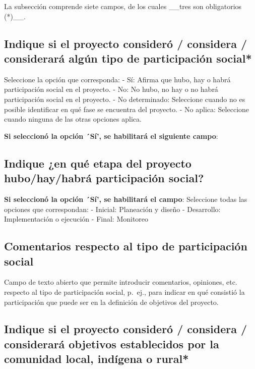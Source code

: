 \documentclass[
]{book}
\begin{document}
La subsección comprende siete campos, de los cuales \_\_tres son obligatorios (*)\_\_.

\hypertarget{indique-si-el-proyecto-consideruxf3-considera-consideraruxe1-alguxfan-tipo-de-participaciuxf3n-social}{%
\subsection{Indique si el proyecto consideró / considera / considerará algún tipo de participación social*}\label{indique-si-el-proyecto-consideruxf3-considera-consideraruxe1-alguxfan-tipo-de-participaciuxf3n-social}}

Seleccione la opción que corresponda:
- Sí: Afirma que hubo, hay o habrá participación social en el proyecto.
- No: No hubo, no hay o no habrá participación social en el proyecto.
- No determinado: Seleccione cuando no es posible identificar en qué fase se encuentra del proyecto.
- No aplica: Seleccione cuando ninguna de las otras opciones aplica.

\textbf{Si seleccionó la opción ´Sí', se habilitará el siguiente campo}:

\hypertarget{indique-en-quuxe9-etapa-del-proyecto-hubohayhabruxe1-participaciuxf3n-social}{%
\subsection{Indique ¿en qué etapa del proyecto hubo/hay/habrá participación social?}\label{indique-en-quuxe9-etapa-del-proyecto-hubohayhabruxe1-participaciuxf3n-social}}

\textbf{Si seleccionó la opción ´Sí', se habilitará el campo}:
Seleccione todas las opciones que correspondan:
- Inicial: Planeación y diseño
- Desarrollo: Implementación o ejecución
- Final: Monitoreo

\hypertarget{comentarios-respecto-al-tipo-de-participaciuxf3n-social}{%
\subsection{Comentarios respecto al tipo de participación social}\label{comentarios-respecto-al-tipo-de-participaciuxf3n-social}}

Campo de texto abierto que permite introducir comentarios, opiniones, etc. respecto al tipo de participación social, p.~ej., para indicar en qué consistió la participación que puede ser en la definición de objetivos del proyecto.

\hypertarget{indique-si-el-proyecto-consideruxf3-considera-consideraruxe1-objetivos-establecidos-por-la-comunidad-local-induxedgena-o-rural}{%
\subsection{Indique si el proyecto consideró / considera / considerará objetivos establecidos por la comunidad local, indígena o rural*}\label{indique-si-el-proyecto-consideruxf3-considera-consideraruxe1-objetivos-establecidos-por-la-comunidad-local-induxedgena-o-rural}}
\end{document}
